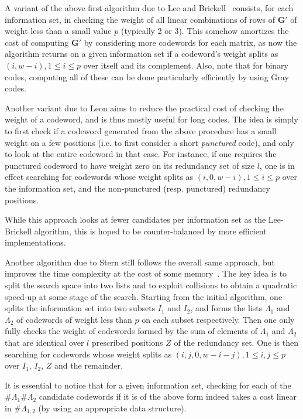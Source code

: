 \documentclass[11pt,a4paper]{article}
\theoremstyle{definition}
\begin{document}
\smallskip

A variant of the above first algorithm due to Lee and Brickell~\cite{LeeBrickell} consists, for each information set, in checking the weight of all linear combinations of rows of $\bm{G}'$ of weight less than a small value $p$ (typically 2 or 3). This somehow amortizes 
the cost of computing $\bm{G}'$ by considering more codewords for each matrix, as now the algorithm returns on a given information set if
a codeword's weight splits as $(i,w-i), 1 \leq i \leq p$ over itself and its complement.
Also, note that for binary codes, computing all of these can be done particularly efficiently by using Gray codes.

\smallskip

Another variant due to Leon aims to reduce the practical cost of checking the weight of a codeword, and is thus mostly useful for long codes. The idea is simply to first check
if a codeword generated from the above procedure has a small weight on a few positions (i.e. to first consider a short \emph{punctured} code), and only to look at the entire
codeword in that case. For instance, if one requires the punctured codeword to have weight zero on its redundancy set of size $l$, one is in effect searching for codewords
whose weight splits as $(i,0,w-i), 1 \leq i \leq p$ over the information set, and the non-punctured (resp. punctured) redundancy positions.

While this approach looks at fewer candidates per information set as the Lee-Brickell algorithm, this is hoped to be counter-balanced by more efficient implementations.

\medskip

Another algorithm due to Stern still follows the overall same approach, but improves the time complexity at the cost of some memory~\cite{Stern}. The key idea is to split the search
space into two lists and to exploit collisions to obtain a quadratic speed-up at some stage of the search. Starting from the initial algorithm, one splits the information set
into two subsets $I_1$ and $I_2$, and forms the lists $\Lambda_1$ and $\Lambda_2$ of codewords of weight less than $p$ on each subset respectively. Then one only fully checks the weight of
codewords formed by the sum of elements of $\Lambda_1$ and $\Lambda_2$ that are identical over $l$ prescribed positions $Z$ of the redundancy set. One is then searching for codewords
whose weight splits as $(i,j,0,w-i-j), 1 \leq i,j \leq p$ over $I_1$, $I_2$, $Z$ and the remainder.

It is essential to notice that for a given information set, checking for each of the $\#\Lambda_1\#\Lambda_2$ candidate codewords if it is of the above form indeed takes a cost
linear in $\#\Lambda_{1,2}$ (by using an appropriate data structure).
\end{document}
